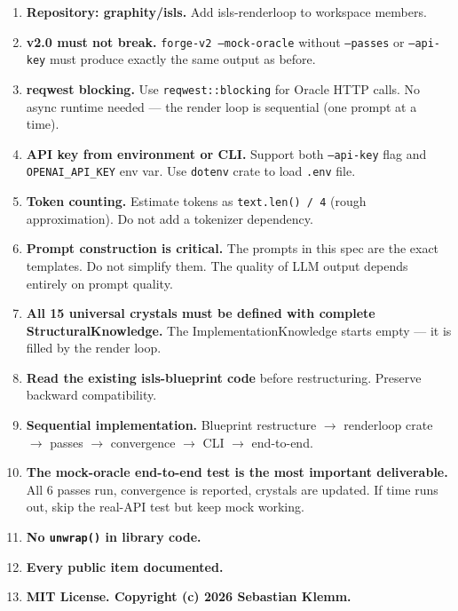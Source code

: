\documentclass[11pt,a4paper]{article}
\begin{document}
\begin{enumerate}
\item \textbf{Repository: graphity/isls.} Add isls-renderloop
  to workspace members.

\item \textbf{v2.0 must not break.} \texttt{forge-v2 --mock-oracle}
  without \texttt{--passes} or \texttt{--api-key} must produce
  exactly the same output as before.

\item \textbf{reqwest blocking.} Use \texttt{reqwest::blocking}
  for Oracle HTTP calls. No async runtime needed --- the render
  loop is sequential (one prompt at a time).

\item \textbf{API key from environment or CLI.} Support both
  \texttt{--api-key} flag and \texttt{OPENAI\_API\_KEY} env var.
  Use \texttt{dotenv} crate to load \texttt{.env} file.

\item \textbf{Token counting.} Estimate tokens as
  \texttt{text.len() / 4} (rough approximation). Do not add
  a tokenizer dependency.

\item \textbf{Prompt construction is critical.} The prompts in
  this spec are the exact templates. Do not simplify them. The
  quality of LLM output depends entirely on prompt quality.

\item \textbf{All 15 universal crystals must be defined with
  complete StructuralKnowledge.} The ImplementationKnowledge
  starts empty --- it is filled by the render loop.

\item \textbf{Read the existing isls-blueprint code} before
  restructuring. Preserve backward compatibility.

\item \textbf{Sequential implementation.} Blueprint restructure
  $\to$ renderloop crate $\to$ passes $\to$ convergence $\to$
  CLI $\to$ end-to-end.

\item \textbf{The mock-oracle end-to-end test is the most
  important deliverable.} All 6 passes run, convergence is
  reported, crystals are updated. If time runs out, skip
  the real-API test but keep mock working.

\item \textbf{No \texttt{unwrap()} in library code.}
\item \textbf{Every public item documented.}
\item \textbf{MIT License. Copyright (c) 2026 Sebastian Klemm.}
\end{enumerate}
\end{document}
